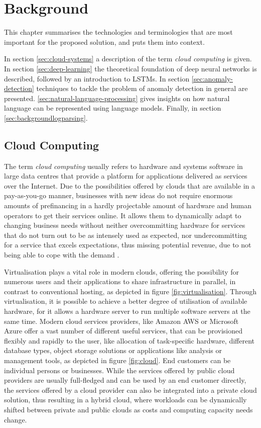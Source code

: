 \chapter{Background\label{cha:background}}
This chapter summarises the technologies and terminologies that are most important for the proposed solution, and puts them into context.

In section \ref{sec:cloud-systems} a description of the term \textit{cloud computing} is given. In section \ref{sec:deep-learning} the theoretical foundation of deep neural networks is described, followed by an introduction to LSTMs. In section \ref{sec:anomaly-detection} techniques to tackle the problem of anomaly detection in general are presented. \ref{sec:natural-language-processing} gives insights on how natural language can be represented using language models. Finally, in section \ref{sec:backgroundlogparsing}.

\section{Cloud Computing\label{sec:cloud-systems}}
The term \textit{cloud computing} usually refers to hardware and systems software in large data centres that provide a platform for applications delivered as services over the Internet. Due to the possibilities offered by clouds that are available in a pay-as-you-go manner, businesses with new ideas do not require enormous amounts of prefinancing in a hardly projectable amount of hardware and human operators to get their services online. It allows them to dynamically adapt to changing business needs without neither overcommitting hardware for services that do not turn out to be as intensely used as expected, nor undercommitting for a service that excels expectations, thus missing potential revenue, due to not being able to cope with the demand \cite{armbrust2010view}.

Virtualisation plays a vital role in modern clouds, offering the possibility for numerous users and their applications to share infrastructure in parallel, in contrast to conventional hosting, as depicted in figure \ref{fig:virtualisation}. Through virtualisation, it is possible to achieve a better degree of utilisation of available hardware, for it allows a hardware server to run multiple software servers at the same time. Modern cloud services providers, like Amazon AWS or Microsoft Azure offer a vast number of different useful services, that can be provisioned flexibly and rapidly to the user, like allocation of task-specific hardware, different database types, object storage solutions or applications like analysis or management tools, as depicted in figure \ref{fig:cloud}. End customers can be individual persons or businesses. While the services offered by public cloud providers are usually full-fledged and can be used by an end customer directly, the services offered by a cloud provider can also be integrated into a private cloud solution, thus resulting in a hybrid cloud, where workloads can be dynamically shifted between private and public clouds as costs and computing capacity needs change.


